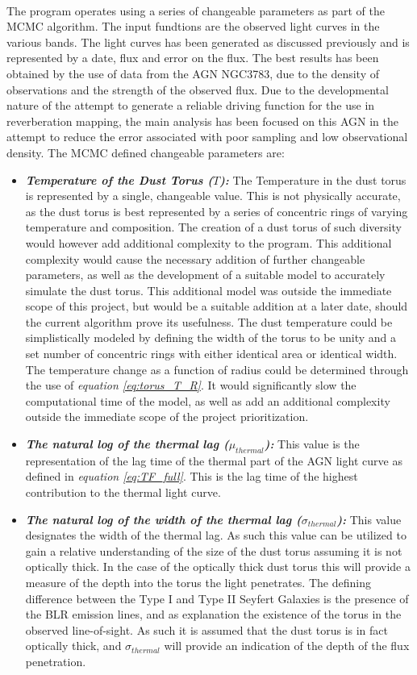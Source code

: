 \documentclass[a4paper, 12pt, twoside]{article}
\begin{document}
\\
The program operates using a series of changeable parameters as part of the MCMC algorithm. The input fundtions are the observed light curves in the various bands. The light curves has been generated as discussed previously and is represented by a date, flux and error on the flux. The best results has been obtained by the use of data from the AGN NGC3783, due to the density of observations and the strength of the observed flux. Due to the developmental nature of the attempt to generate a reliable driving function for the use in reverberation mapping, the main analysis has been focused on this AGN in the attempt to reduce the error associated with poor sampling and low observational density. The MCMC defined changeable parameters are:
\begin{itemize}
\item {\bf{\emph{Temperature of the Dust Torus ($T$):}}} The Temperature in the dust torus is represented by a single, changeable value. This is not physically accurate, as the dust torus is best represented by a series of concentric rings of varying temperature and composition. The creation of a dust torus of such diversity would however add additional complexity to the program. This additional complexity would cause the necessary addition of further changeable parameters, as well as the development of a suitable model to accurately simulate the dust torus. This additional model was outside the immediate scope of this project, but would be a suitable addition at a later date, should the current algorithm prove its usefulness. The dust temperature could be simplistically modeled by defining the width of the torus to be unity and a set number of concentric rings with either identical area or identical width. The temperature change as a function of radius could be determined through the use of \emph{equation \ref{eq:torus_T_R}}. It would significantly slow the computational time of the model, as well as add an additional complexity outside the immediate scope of the project prioritization. 
\item {\bf{\emph{The natural log of the thermal lag ($\mu_{thermal}$):}}} This value is the representation of the lag time of the thermal part of the AGN light curve as defined in \emph{equation \ref{eq:TF_full}}. This is the lag time of the highest contribution to the thermal light curve.
\item {\bf{\emph{The natural log of the width of the thermal lag ($\sigma_{thermal}$):}}} This value designates the width of the thermal lag. As such this value can be utilized to gain a relative understanding of the size of the dust torus assuming it is not optically thick. In the case of the optically thick dust torus this will provide a measure of the depth into the torus the light penetrates. The defining difference between the Type I and Type II Seyfert Galaxies is the presence of the BLR emission lines, and as explanation the existence of the torus in the observed line-of-sight. As such it is assumed that the dust torus is in fact optically thick, and $\sigma_{thermal}$ will provide an indication of the depth of the flux penetration. 

\end{itemize}
\end{document}
